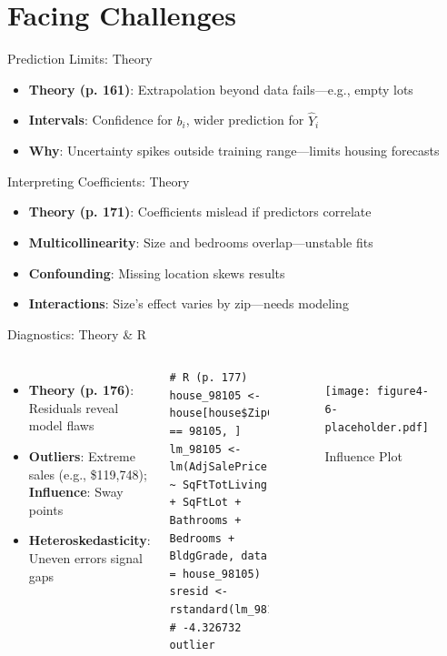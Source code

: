 \documentclass{beamer}
\begin{document}
	\section{Facing Challenges}
	
	\begin{frame}{Prediction Limits: Theory}
		\begin{itemize}
			\item \textbf{Theory (p. 161)}: Extrapolation beyond data fails—e.g., empty lots
			\item \textbf{Intervals}: Confidence for $b_i$, wider prediction for $\hat{Y}_i$
			\item \textbf{Why}: Uncertainty spikes outside training range—limits housing forecasts
		\end{itemize}
	\end{frame}
	
	\begin{frame}{Interpreting Coefficients: Theory}
		\begin{itemize}
			\item \textbf{Theory (p. 171)}: Coefficients mislead if predictors correlate
			\item \textbf{Multicollinearity}: Size and bedrooms overlap—unstable fits
			\item \textbf{Confounding}: Missing location skews results
			\item \textbf{Interactions}: Size’s effect varies by zip—needs modeling
		\end{itemize}
	\end{frame}
	
	\begin{frame}[fragile]{Diagnostics: Theory \& R}
		\begin{columns}
			\begin{itemize}
				\item \textbf{Theory (p. 176)}: Residuals reveal model flaws
				\item \textbf{Outliers}: Extreme sales (e.g., \$119,748); \textbf{Influence}: Sway points
				\item \textbf{Heteroskedasticity}: Uneven errors signal gaps
			\end{itemize}
			\begin{lstlisting}
# R (p. 177)
house_98105 <- house[house$ZipCode == 98105, ]
lm_98105 <- lm(AdjSalePrice ~ SqFtTotLiving + SqFtLot + Bathrooms +
Bedrooms + BldgGrade, data = house_98105)
sresid <- rstandard(lm_98105)  # -4.326732 outlier
			\end{lstlisting}
			\begin{figure}
				\texttt{[image: figure4-6-placeholder.pdf]}
				\caption{Influence Plot}
			\end{figure}
		\end{columns}
	\end{frame}
	
\end{document}
